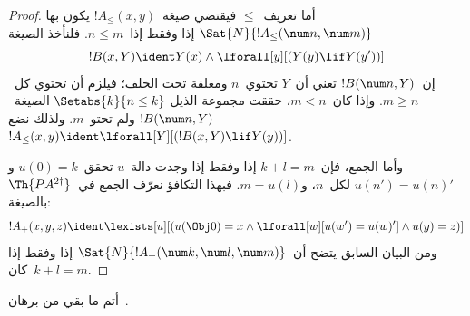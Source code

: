 \documentclass[../../../include/open-logic-section]{subfiles}
\begin{document}
\begin{proof}
أما تعريف~$\le$ فيقتضي صيغة~$!A_\le(x, y)$ يكون بها
$\Sat{N}{!A_\le(\num n, \num m)}$ إذا وفقط إذا~$n \le m$.
فلنأخذ الصيغة
\[
!B(x, Y) \ident Y(x) \land \lforall[y][(Y(y) \lif Y(y'))]
\]
إن~$!B(\num n,Y)$ تعني أن~$Y$ تحتوي~$n$ ومغلقة تحت الخلف؛
فيلزم أن تحتوي كل~$m\ge n$. وإذا كان~$m<n$، حققت مجموعة الذيل
$\Setabs{k}{n\le k}$ الصيغة~$!B(\num n,Y)$ ولم تحتو~$m$.
ولذلك نضع~$!A_\le(x, y) \ident
\lforall[Y][(!B(x, Y) \lif Y(y))]$.

وأما الجمع، فإن~$k+l=m$ إذا وفقط إذا وجدت دالة~$u$
تحقق~$u(0)=k$ و$u(n')=u(n)'$ لكل~$n$، و$m = u(l)$.
فبهذا التكافؤ نعرّف الجمع في~$\Th{PA^{2\dagger}}$
بالصيغة:
\[
!A_+(x,y,z) \ident \lexists[u][(u(\Obj 0)=x \land \lforall[w][u(w')=u
 (w)'] \land u(y)=z)]
\] 
ومن البيان السابق يتضح أن~$\Sat{N}{!A_+(\num k, \num l, \num m)}$
إذا وفقط إذا كان~$k+l=m$.
\end{proof}

\begin{prob}
أتم ما بقي من برهان~.
\end{prob}
\end{document}
